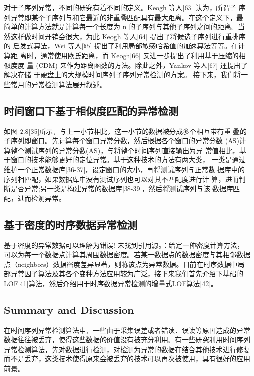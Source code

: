 \documentclass{article}
\begin{document}
\par 对于子序列异常，不同的研究有着不同的定义。Keogh 等人[63] 认为，所谓子 序列异常即某个子序列与和它最近的非重叠匹配具有最大距离。在这个定义下，最 简单的计算方法就是计算每一个长度为 n 的子序列与其他子序列之间的距离。当然这样做时间开销会很大，为此 Keogh 等人[64] 提出了将候选子序列进行重排序的 启发式算法，Wei 等人[65] 提出了利用局部敏感哈希值的加速算法等等。在计算距 离时，通常使用欧氏距离，而 Keogh[66] 又进一步提出了利用基于压缩的相似度度 量 (CDM) 来作为距离函数的方法。除此之外，Yankov 等人[67] 还提出了解决存储 于硬盘上的大规模时间序列子序列异常检测的方案。 接下来，我们将一些常用的异常检测算法展开叙述。

\subsection{时间窗口下基于相似度匹配的异常检测 }
如图 2.8[35]所示，与上一小节相比，这一小节的数据被分成多个相互带有重 叠的子序列即窗口。先计算每个窗口异常分数，然后根据各个窗口的异常分数 (AS)计算整个测试序列的异常分数(AS)，与将整个时间序列直接输出为异 常值相比，基于窗口的技术能够更好的定位异常。基于这种技术的方法有两大类， 一类是通过维护一个正常数据库[36-37]，设定窗口的大小，再将测试序列与正常数 据库中的序列相匹配，如果数据库中没有测试序列也可以对其不匹配度进行计 算，进而判断是否异常;另一类是构建异常的数据库[38-39]，然后将测试序列与该 数据库匹配，进而检测异常。 


\subsection{基于密度的时序数据异常检测}
基于密度的异常数据可以理解为错误! 未找到引用源。：给定一种密度计算方法，可以为每一个数据点计算其周围数据密度。若某一数据点的数据密度与其相邻数据点（neighbors）数据密度差异显著，则称该点为异常数据。目前在时序数据中局部异常因子算法及其各个变种方法应用较为广泛，接下来我们首先介绍下基础的LOF[41]算法，然后介绍用于时序数据异常检测的增量式LOF算法[42]。


\subsection{Summary and Discussion }

在时间序列异常检测算法中，一些由于采集误差或者错读、误读等原因造成的异常数据往往被丢弃，使得这些数据的价值没有被充分利用。有一些研究利用时间序列异常检测算法，先对数据进行检测，对检测为异常的数据在结合其他技术进行修复而不是丢弃，这类技术使得原来会被丢弃的技术可以再次被使用，具有很好的应用前景。
\end{document}
